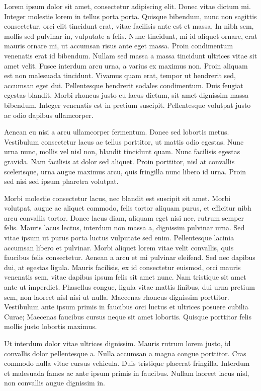 Lorem ipsum dolor sit amet, consectetur adipiscing elit. Donec vitae dictum mi. Integer molestie lorem in tellus porta porta. Quisque bibendum, nunc non sagittis consectetur, orci elit tincidunt erat, vitae facilisis ante est et massa. In nibh sem, mollis sed pulvinar in, vulputate a felis. Nunc tincidunt, mi id aliquet ornare, erat mauris ornare mi, ut accumsan risus ante eget massa. Proin condimentum venenatis erat id bibendum. Nullam sed massa a massa tincidunt ultrices vitae sit amet velit. Fusce interdum arcu urna, a varius ex maximus non. Proin aliquam est non malesuada tincidunt. Vivamus quam erat, tempor ut hendrerit sed, accumsan eget dui. Pellentesque hendrerit sodales condimentum. Duis feugiat egestas blandit. Morbi rhoncus justo eu lacus dictum, sit amet dignissim massa bibendum. Integer venenatis est in pretium suscipit. Pellentesque volutpat justo ac odio dapibus ullamcorper.

Aenean eu nisi a arcu ullamcorper fermentum. Donec sed lobortis metus. Vestibulum consectetur lacus ac tellus porttitor, ut mattis odio egestas. Nunc urna nunc, mollis vel nisl non, blandit tincidunt quam. Nunc facilisis egestas gravida. Nam facilisis at dolor sed aliquet. Proin porttitor, nisl at convallis scelerisque, urna augue maximus arcu, quis fringilla nunc libero id urna. Proin sed nisi sed ipsum pharetra volutpat.

Morbi molestie consectetur lacus, nec blandit est suscipit sit amet. Morbi volutpat, augue ac aliquet commodo, felis tortor aliquam purus, et efficitur nibh arcu convallis tortor. Donec lacus diam, aliquam eget nisi nec, rutrum semper felis. Mauris lacus lectus, interdum non massa a, dignissim pulvinar urna. Sed vitae ipsum ut purus porta luctus vulputate sed enim. Pellentesque lacinia accumsan libero et pulvinar. Morbi aliquet lorem vitae velit convallis, quis faucibus felis consectetur. Aenean a arcu et mi pulvinar eleifend. Sed nec dapibus dui, at egestas ligula. Mauris facilisis, ex id consectetur euismod, orci mauris venenatis sem, vitae dapibus ipsum felis sit amet nunc. Nam tristique sit amet ante ut imperdiet. Phasellus congue, ligula vitae mattis finibus, dui urna pretium sem, non laoreet nisl nisi ut nulla. Maecenas rhoncus dignissim porttitor. Vestibulum ante ipsum primis in faucibus orci luctus et ultrices posuere cubilia Curae; Maecenas faucibus cursus neque sit amet lobortis. Quisque porttitor felis mollis justo lobortis maximus.

Ut interdum dolor vitae ultrices dignissim. Mauris rutrum lorem justo, id convallis dolor pellentesque a. Nulla accumsan a magna congue porttitor. Cras commodo nulla vitae cursus vehicula. Duis tristique placerat fringilla. Interdum et malesuada fames ac ante ipsum primis in faucibus. Nullam laoreet lacus nisl, non convallis augue dignissim in.

